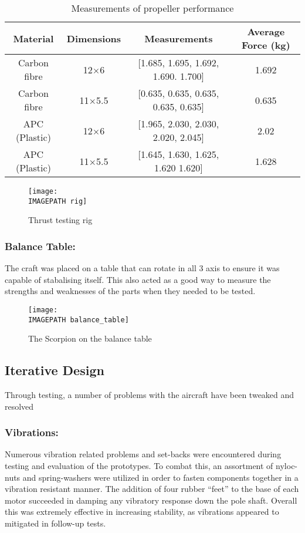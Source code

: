 \begin{table}[htbp]
	\centering
	\begin{tabular}{|c|c|c|c|}
		\hline Material & Dimensions & Measurements & Average Force (kg) \\ 
		\hline Carbon fibre & 12$\times$6 & [1.685, 1.695, 1.692, 1.690. 1.700] & 1.692 \\ 
		\hline Carbon fibre & 11$\times$5.5 & [0.635, 0.635, 0.635, 0.635, 0.635] & 0.635 \\ 
		\hline APC (Plastic) & 12$\times$6 & [1.965, 2.030, 2.030, 2.020, 2.045] & 2.02 \\ 
		\hline APC (Plastic) & 11$\times$5.5 & [1.645, 1.630, 1.625, 1.620 1.620] & 1.628 \\ 
		\hline 
	\end{tabular} 
	\caption{Measurements of propeller performance}
	\label{tab:props}
\end{table}

\begin{figure}[!h]
	\centering
	\texttt{[image: \\IMAGEPATH rig]}
	\caption{Thrust testing rig}
	\label{fig:rig}
\end{figure}



\subsubsection*{Balance Table:} The craft was placed on a table that can rotate in all 3 axis to ensure it was capable of stabalising itself. This also acted as a good way to measure the strengths and weaknesses of the parts when they needed to be tested. 

\begin{figure}[!h]
	\centering
	\texttt{[image: \\IMAGEPATH balance\_table]}
	\caption{The Scorpion on the balance table}
	\label{fig:balance_table}
\end{figure}


\subsection{Iterative Design}
Through testing, a number of problems with the aircraft have been tweaked and resolved

\subsubsection*{Vibrations:} Numerous vibration related problems and set-backs were encountered during testing and evaluation of the prototypes. To combat this, an assortment of nyloc-nuts and spring-washers were utilized in order to fasten components together in a vibration resistant manner. The addition of four rubber ``feet'' to the base of each motor succeeded in damping any vibratory response down the pole shaft. Overall this was extremely effective in increasing stability, as vibrations appeared to mitigated in follow-up tests.

